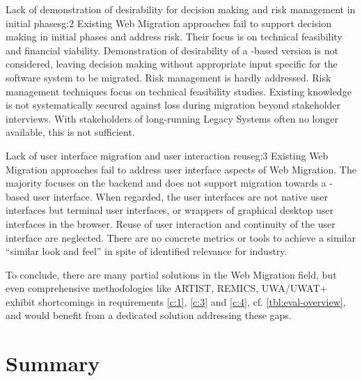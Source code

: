 \begin{gap}{Lack of demonstration of desirability for decision making and risk management in initial phases}{g:2}
Existing \gls{Web Migration} approaches fail to support decision making in initial phases and address risk.
Their focus is on technical feasibility and financial viability.
Demonstration of desirability of a -based version is not considered, leaving decision making without appropriate input specific for the software system to be migrated.
Risk management is hardly addressed.
Risk management techniques focus on technical feasibility studies.
Existing knowledge is not systematically secured against loss during migration beyond stakeholder interviews.
With stakeholders of long-running \glspl{Legacy System} often no longer available, this is not sufficient.
\end{gap}

\begin{gap}{Lack of user interface migration and user interaction reuse}{g:3}
Existing \gls{Web Migration} approaches fail to address user interface aspects of \gls{Web Migration}.
The majority focuses on the backend and does not support migration towards a -based user interface.
When regarded, the user interfaces are not native \web user interfaces but terminal user interfaces, or wrappers of graphical desktop user interfaces in the browser.
Reuse of user interaction and continuity of the user interface are neglected.
There are no concrete metrics or tools to achieve a similar ``similar look and feel'' in spite of identified relevance for industry.
\end{gap}
 
To conclude, there are many partial solutions in the \gls{Web Migration} field, but even comprehensive methodologies like ARTIST, REMICS, UWA/UWAT+ exhibit shortcomings in requirements \cref{c:1}, \cref{c:3} and \cref{c:4}, cf. \cref{tbl:eval-overview}, and would benefit from a dedicated solution addressing these gaps.

\vspace{-15pt}
\hypertarget{sec:sota.summary}{%
\section{Summary}\label{sec:sota.summary}}
\vspace{15pt}

